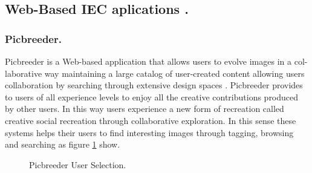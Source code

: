\subsection{Web-Based IEC aplications .}


\subsubsection{Picbreeder.}
Picbreeder is a Web-based application that allows users to evolve images in a
col-laborative way maintaining a large catalog of user-created content allowing
users collaboration by searching through extensive design spaces
\cite{secretan2008picbreeder}. Picbreeder provides to users of all
experience levels to enjoy all the creative contributions produced by other
users. In this way users experience a new form of recreation called creative
social recreation through collaborative exploration. In this sense these systems
helps their users to find interesting images through tagging, browsing and
searching as figure  \ref{fig:Picbreeder} show.

\begin{figure}
\captionsetup{justification=centering,margin=2cm}
\centering
\setlength\fboxsep{0pt}
\setlength\fboxrule{0.7pt}
\caption{Picbreeder User Selection.}
\label{fig:Picbreeder}
\end{figure}

